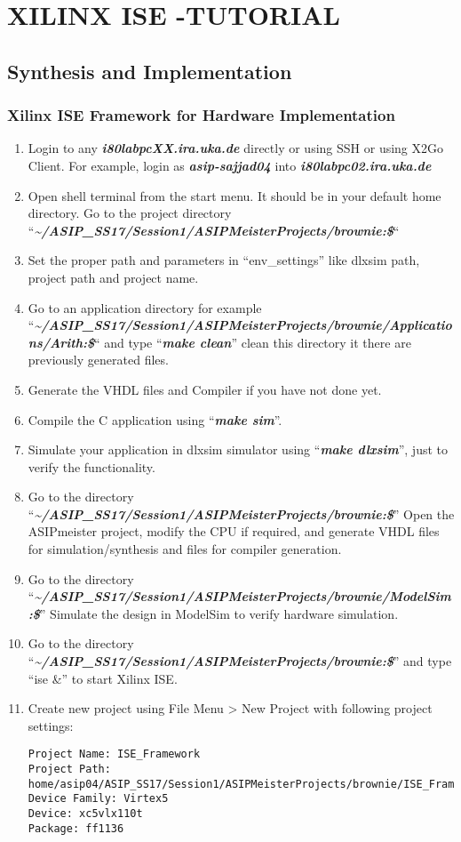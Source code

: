 \chapter*{XILINX ISE -TUTORIAL}
\section*{Synthesis and Implementation}
\subsection{Xilinx ISE Framework for Hardware Implementation}
\begin{enumerate}
	\item
	Login to any \emph{\textbf{i80labpcXX.ira.uka.de}} directly or using
	SSH or using X2Go Client. For example, login as
	\emph{\textbf{asip-sajjad04}} into
	\emph{\textbf{i80labpc02.ira.uka.de}}
	\item
	Open shell terminal from the start menu. It should be in your default
	home directory. Go to the project directory 
	``\emph{\small{\textbf{\textasciitilde/ASIP\_SS17/Session1/ASIPMeisterProjects/brownie:\$}}}``
	\item
	Set the proper path and parameters in ``env\_settings'' like dlxsim
	path, project path and project name.
	\item
	Go to an application directory for example 
	``\emph{\small{\textbf{\textasciitilde/ASIP\_SS17/Session1/ASIPMeisterProjects/brownie/Applications/Arith:\$}}}``
	and type ``\emph{\textbf{make clean}}'' clean this directory it there
	are previously generated files.
	\item
	Generate the VHDL files and Compiler if you have not done yet.
	\item
	Compile the C application using ``\emph{\textbf{make sim}}''.
	\item
	Simulate your application in dlxsim simulator using
	``\emph{\textbf{make dlxsim}}'', just to verify the functionality.
	\item
	Go to the directory 
	``\emph{\small{\textbf{\textasciitilde/ASIP\_SS17/Session1/ASIPMeisterProjects/brownie:\$}}}''
	Open the ASIPmeister project, modify the CPU if required, and generate
	VHDL files for simulation/synthesis and files for compiler generation.
	\item
	Go to the directory 
	``\emph{\small{\textbf{\textasciitilde/ASIP\_SS17/Session1/ASIPMeisterProjects/brownie/ModelSim:\$}}}''
	Simulate the design in ModelSim to verify hardware simulation.
	\item
	Go to the directory 
	``\emph{\small{\textbf{\textasciitilde/ASIP\_SS17/Session1/ASIPMeisterProjects/brownie:\$}}}''
	and type ``ise \&'' to start Xilinx ISE.
	\item Create new project using File Menu \textgreater{} New Project with
	following project settings:
\begin{lstlisting}
Project Name: ISE_Framework
Project Path:
home/asip04/ASIP_SS17/Session1/ASIPMeisterProjects/brownie/ISE_Framework
Device Family: Virtex5
Device: xc5vlx110t
Package: ff1136
\end{lstlisting}


\end{enumerate}
